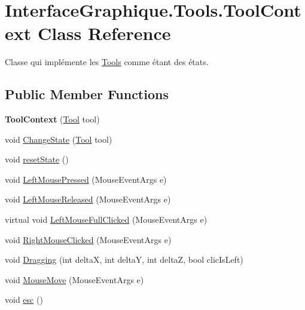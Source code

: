 \hypertarget{class_interface_graphique_1_1_tools_1_1_tool_context}{}\section{Interface\+Graphique.\+Tools.\+Tool\+Context Class Reference}
\label{class_interface_graphique_1_1_tools_1_1_tool_context}


Classe qui implémente les \hyperlink{namespace_interface_graphique_1_1_tools}{Tools} comme étant des états.  


\subsection*{Public Member Functions}
\begin{DoxyCompactItemize}
\item 
\hypertarget{class_interface_graphique_1_1_tools_1_1_tool_context_a344706278b7042c8acdbdd20b98fc5e3}{}{\bfseries Tool\+Context} (\hyperlink{class_interface_graphique_1_1_tools_1_1_tool}{Tool} tool)\label{class_interface_graphique_1_1_tools_1_1_tool_context_a344706278b7042c8acdbdd20b98fc5e3}

\item 
void \hyperlink{class_interface_graphique_1_1_tools_1_1_tool_context_ade97797adf505d17e91a0b50ca8c5cf2}{Change\+State} (\hyperlink{class_interface_graphique_1_1_tools_1_1_tool}{Tool} tool)
\item 
void \hyperlink{class_interface_graphique_1_1_tools_1_1_tool_context_a8034bf986a46145bdc1ea020fda4df52}{reset\+State} ()
\item 
void \hyperlink{class_interface_graphique_1_1_tools_1_1_tool_context_a7ccfe5c95f9a2d36df97a5ca519f5f34}{Left\+Mouse\+Pressed} (Mouse\+Event\+Args e)
\item 
void \hyperlink{class_interface_graphique_1_1_tools_1_1_tool_context_ac57c92d2942edf74c36f017d1832f552}{Left\+Mouse\+Released} (Mouse\+Event\+Args e)
\item 
virtual void \hyperlink{class_interface_graphique_1_1_tools_1_1_tool_context_af5db46287ee0ac38e2fc409226fdbf4e}{Left\+Mouse\+Full\+Clicked} (Mouse\+Event\+Args e)
\item 
void \hyperlink{class_interface_graphique_1_1_tools_1_1_tool_context_a8aacce09581d7074fa196b65bf4bdd2a}{Right\+Mouse\+Clicked} (Mouse\+Event\+Args e)
\item 
void \hyperlink{class_interface_graphique_1_1_tools_1_1_tool_context_adf8f0e7bca71bcc71159558ea415a979}{Dragging} (int delta\+X, int delta\+Y, int delta\+Z, bool clic\+Is\+Left)
\item 
void \hyperlink{class_interface_graphique_1_1_tools_1_1_tool_context_abd1e936c04682a345bd45e345b8459ae}{Mouse\+Move} (Mouse\+Event\+Args e)
\item 
void \hyperlink{class_interface_graphique_1_1_tools_1_1_tool_context_a734a2f11bb0b7af1899407bcf02cfc2d}{esc} ()
\end{DoxyCompactItemize}
